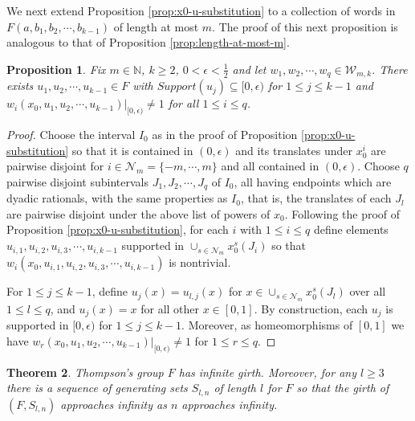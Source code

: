 \documentclass[11pt]{amsart}
\newtheorem{theorem}{Theorem}[section]
\newtheorem{proposition}[theorem]{Proposition}
\begin{document}
We next extend Proposition \ref{prop:x0-u-substitution} to a collection of words
in $F(a,b_1, b_2, \cdots ,b_{k-1})$ of length at most $m$.  The proof of this next
proposition is analogous to that of Proposition
\ref{prop:length-at-most-m}.

\begin{proposition}
\label{prop:multiple-words}
Fix $m \in {\mathbb N}$, $k \geq 2$, $0 < \epsilon < \frac{1}{2}$ and let $w_1,w_2, \cdots ,w_q \in {{\mathcal W}_{m,k}}$.  There exists $u_1,u_2, \cdots ,u_{k-1} \in F$ with $Support(u_j) \subseteq [0, \epsilon)$ for $1 \leq j \leq k-1$ and $w_i(x_0,u_1,u_2, \cdots ,u_{k-1})|_{[0, \epsilon)}\neq 1$ for all $1 \leq i \leq q$.
\end{proposition}

\begin{proof}
Choose the interval $I_0$ as in the proof of Proposition
\ref{prop:x0-u-substitution} so that it is contained in $(0,
\epsilon)$ and its translates under $x_0^i$ are pairwise
disjoint for $i \in {\mathcal N}_m=\{-m, \cdots ,m\}$ and all contained in $(0, \epsilon)$.  Choose $q$
pairwise disjoint subintervals $J_1,J_2, \cdots ,J_q$ of $I_0$,
all having endpoints which are dyadic rationals, with the same
properties as $I_0$, that is, the translates of each $J_l$ are
pairwise disjoint under the above list of powers of $x_0$.
Following the proof of Proposition \ref{prop:x0-u-substitution},
for each $i$ with $1 \leq i \leq q$ define elements $u_{i,1},
u_{i,2},u_{i,3}, \cdots ,u_{i,k-1}$ supported in $\cup_{s \in
{\mathcal N}_m} x_0^s(J_i)$ so that $w_i(x_0,u_{i,1},
u_{i,2},u_{i,3}, \cdots ,u_{i,k-1})$ is nontrivial.

 For $1 \leq j \leq k-1$, define $u_j(x) = u_{l,j}(x)$ for $x \in \cup_{s \in
{\mathcal N}_m} x_0^s(J_l)$ over all $1 \leq l \leq q$, and
$u_j(x) = x$ for
 all other $x \in [0,1]$.  By construction, each $u_j$ is supported in $[0, \epsilon)$ for $1 \leq j \leq k-1$. Moreover, as homeomorphisms of $[0,1]$ we have
 $w_r(x_0,u_1,u_2, \cdots ,u_{k-1})|_{[0, \epsilon)} \neq 1$ for $1 \leq r \leq q$.
\end{proof}

\begin{theorem}\label{thm:girth}
Thompson's group $F$ has infinite girth.  Moreover, for any $l
\geq 3$ there is a sequence of generating sets $S_{l,n}$ of length
$l$ for $F$ so that the girth of $(F,S_{l,n})$ approaches infinity
as $n$ approaches infinity.
\end{theorem}
\end{document}
